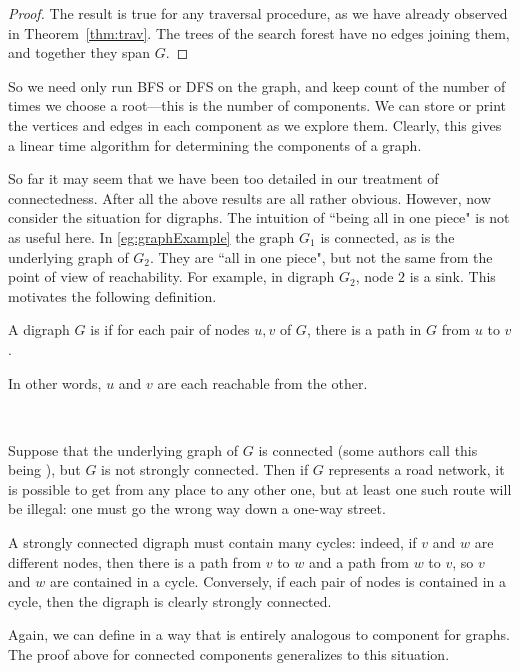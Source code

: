\begin{proof}
The result is true for any traversal procedure, as we have already observed in 
Theorem~\ref{thm:trav}. The trees of the search forest have no edges joining 
them, and together they span $G$.
\end{proof}

So we need only run BFS or DFS on the graph, and keep count
of the number of times we choose a root---this is the number of
components. We can store or print the vertices and edges in each
component as we explore them. Clearly, this gives a linear time algorithm
for determining the components of a graph.

So far it may seem that we have been too detailed in our treatment of 
connectedness. After all the above results are all rather obvious.
However, now consider the situation for digraphs. The intuition of ``being all 
in one piece" is not as useful here. In
\cref{eg:graphExample} the graph $G_1$ is connected, as is the
underlying graph of $G_2$. They are ``all in one piece", but not the
same from the point of view of reachability. For example, in digraph
$G_2$, node $2$ is a sink. This motivates the following definition.

\begin{Definition}
A digraph $G$ is  if for each pair of nodes $u, v$ 
of $G$, there is a path in $G$ from $u$ to $v$.
\end{Definition}

\begin{note}
In other words, $u$ and $v$ are each reachable from the other.

\

Suppose that the underlying graph of $G$ is connected (some authors call
this being ), but $G$ is not strongly
connected. Then if $G$ represents a road network, it is possible to get
from any place to any other one, but at least one such route will be
illegal: one must go the wrong way down a one-way street. 
\end{note}

A strongly connected digraph must contain many cycles: indeed, if $v$ and
$w$ are different nodes, then there is a path from $v$ to $w$ and a path
from $w$ to $v$, so $v$ and $w$ are contained in a cycle. Conversely, if
each pair of nodes is contained in a cycle, then the digraph is clearly
strongly connected.

Again, we can define  in a
way that is entirely analogous to component for graphs. The proof
above for connected components generalizes to this situation.

